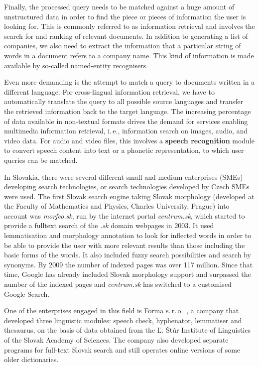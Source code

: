 \begin{multicols}{2}
Finally, the processed query needs to be matched against a huge amount of unstructured data in order to find the piece or pieces of information the user is looking for. This is commonly referred to as information retrieval and involves the search for and ranking of relevant documents. In addition to generating a list of companies, we also need to extract the information that a particular string of words in a document refers to a company name. This kind of information is made available by so-called named-entity recognisers. 

Even more demanding is the attempt to match a query to documents written in a different language. For cross-lingual information retrieval, we have to automatically translate the query to all possible source languages and transfer the retrieved information back to the target language. The increasing percentage of data available in non-textual formats drives the demand for services enabling multimedia information retrieval, i.\,e., information search on images, audio, and video data. For audio and video files, this involves a \textbf{speech recognition} module to convert speech content into text or a phonetic representation, to which user queries can be matched.

In Slovakia, there were several different small and medium enterprises (SMEs) developing search technologies, or search technologies developed by Czech SMEs were used. The first Slovak search engine taking Slovak morphology (developed at the Faculty of Mathematics and Physics, Charles University, Prague) into account was \emph{morfeo.sk}, run by the internet portal \emph{centrum.sk}, which started to provide a fulltext search of the \emph{.sk} domain webpages in 2003. It used lemmatisation and morphology annotation to look for inflected words in order to be able to provide the user with more relevant results than those including the basic forms of the words. It also included fuzzy search possibilities and search by synonyms. By 2009 the number of indexed pages was over 117 million. Since that time, Google has already included Slovak morphology support and surpassed the number of the indexed pages and \emph{centrum.sk} has switched to a customised Google Search.

One of the enterprises engaged in this field is Forma s.\,r.\,o.~\cite{f25}, a company that developed three linguistic modules: speech check, hyphenator, lemmatiser and thesaurus, on the basis of data obtained from the Ľ. Štúr Institute of Linguistics of the Slovak Academy of Sciences. The company also developed separate programs for full-text Slovak search and still operates online versions of some older dictionaries. 


\end{multicols}

